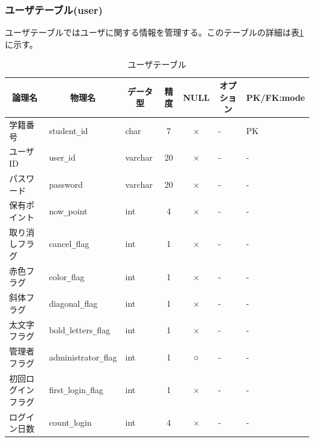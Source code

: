 \documentclass[a4j]{jarticle}
\begin{document}
\subsubsection{ユーザテーブル(user)}
ユーザテーブルではユーザに関する情報を管理する。このテーブルの詳細は表\ref{tab:user} に示す。
\begin{table}[h]

  \caption{ユーザテーブル}
  \begin{center}
    \footnotesize
    \begin{tabular}{|l|l|l|c|c|l|l|} \hline

      \multicolumn{1}{|c|}{論理名}&\multicolumn{1}{|c|}{物理名}&\multicolumn{1}{|c|}{データ型}&精度&NULL&\multicolumn{1}{|c|}{オプション}&\multicolumn{1}{|c|}{PK/FK:mode}\\\hline \hline
      学籍番号&student\verb|_|id&char&7&×&-&\multicolumn{1}{|l|}{PK} \\\hline
      ユーザID&user\verb|_|id&varchar&20&×&-&- \\ \hline
      パスワード&password&varchar&20&×&-&- \\ \hline
      保有ポイント&now\verb|_|point&int&4&×&-&- \\ \hline
      取り消しフラグ&cancel\verb|_|flag&int&1&×&-&- \\ \hline
      赤色フラグ&color\verb|_|flag&int&1&×&-&- \\ \hline
      斜体フラグ&diagonal\verb|_|flag&int&1&×&-&- \\ \hline
      太文字フラグ&bold\verb|_|letters\verb|_|flag&int&1&×&-&- \\ \hline
      管理者フラグ&administrator\verb|_|flag&int&1&○&-&- \\ \hline
      初回ログインフラグ&first\verb|_|login\verb|_|flag&int&1&×&-&- \\ \hline
      ログイン日数&count\verb|_|login&int&4&×&-&-\\ \hline 
    \end{tabular}
    \label{tab:user}
  \end{center}
\end{table}
\end{document}
